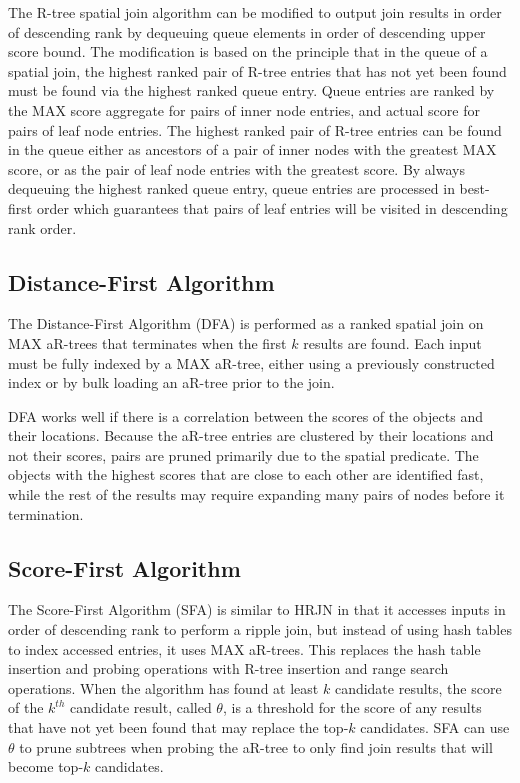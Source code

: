 The R-tree spatial join algorithm can be modified to output join results in order of descending rank by dequeuing queue elements in order of descending upper score bound. The modification is based on the principle that in the queue of a spatial join, the highest ranked pair of R-tree entries that has not yet been found must be found via the highest ranked queue entry. Queue entries are ranked by the MAX score aggregate for pairs of inner node entries, and actual score for pairs of leaf node entries. The highest ranked pair of R-tree entries can be found in the queue either as ancestors of a pair of inner nodes with the greatest MAX score, or as the pair of leaf node entries with the greatest score. By always dequeuing the highest ranked queue entry, queue entries are processed in best-first order which guarantees that pairs of leaf entries will be visited in descending rank order.

\subsection{Distance-First Algorithm}

The Distance-First Algorithm (DFA) is performed as a ranked spatial join on MAX aR-trees that terminates when the first \(k\) results are found. Each input must be fully indexed by a MAX aR-tree, either using a previously constructed index or by bulk loading an aR-tree prior to the join.

DFA works well if there is a correlation between the scores of the objects and their locations. Because the aR-tree entries are clustered by their locations and not their scores, pairs are pruned primarily due to the spatial predicate. The objects with the highest scores that are close to each other are identified fast, while the rest of the results may require expanding many pairs of nodes before it termination.

\subsection{Score-First Algorithm}

The Score-First Algorithm (SFA) is similar to HRJN in that it accesses inputs in order of descending rank to perform a ripple join, but instead of using hash tables to index accessed entries, it uses MAX aR-trees. This replaces the hash table insertion and probing operations with R-tree insertion and range search operations. When the algorithm has found at least \(k\) candidate results, the score of the \(k^{th}\) candidate result, called \(\theta\), is a threshold for the score of any results that have not yet been found that may replace the top-\(k\) candidates. SFA can use \(\theta\) to prune subtrees when probing the aR-tree to only find join results that will become top-\(k\) candidates.

